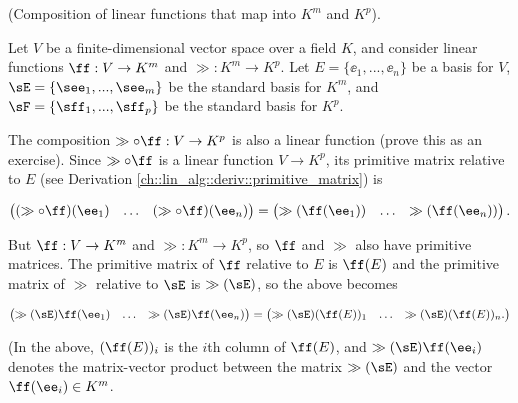 \begin{defn}
\label{ch::lin_alg::thm::matrix_matrix_product_relative_to_bases_primitive}

    (Composition of linear functions that map into $K^m$ and $K^p$). 
    
    Let $V$ be a finite-dimensional vector space over a field $K$, and consider linear functions $\ff:V \rightarrow K^m$ and $\gg:K^m \rightarrow K^p$. Let $E = \{\ee_1, ..., \ee_n\}$ be a basis for $V$, $\sE = \{\see_1, ..., \see_m\}$ be the standard basis for $K^m$, and $\sF = \{\sff_1, ..., \sff_p\}$ be the standard basis for $K^p$.
    
    The composition $\gg \circ \ff:V \rightarrow K^p$ is also a linear function (prove this as an exercise). Since $\gg \circ \ff$ is a linear function $V \rightarrow K^p$, its primitive matrix relative to $E$ (see Derivation \ref{ch::lin_alg::deriv::primitive_matrix}) is
    
    \begin{align*}
        \begin{pmatrix}
            (\gg \circ \ff)(\ee_1) & \hdots & (\gg \circ \ff)(\ee_n)
        \end{pmatrix}
        =
        \begin{pmatrix}
            \gg(\ff(\ee_1)) & \hdots & \gg(\ff(\ee_n))
        \end{pmatrix}.
    \end{align*}
    
    But $\ff:V \rightarrow K^m$ and $\gg:K^m \rightarrow K^p$, so $\ff$ and $\gg$ also have primitive matrices. The primitive matrix of $\ff$ relative to $E$ is $\ff(E)$ and the primitive matrix of $\gg$ relative to $\sE$ is $\gg(\sE)$, so the above becomes
    
    \begin{align*}
        \begin{pmatrix}
            \gg(\sE) \ff(\ee_1) & \hdots & \gg(\sE) \ff(\ee_n)
        \end{pmatrix}
        =
        \begin{pmatrix} 
            \gg(\sE) (\ff(E))_1 & \hdots & \gg(\sE) (\ff(E))_n.
        \end{pmatrix}
    \end{align*}
    
    (In the above, $(\ff(E))_i$ is the $i$th column of $\ff(E)$, and $\gg(\sE) \ff(\ee_i)$ denotes the matrix-vector product between the matrix $\gg(\sE)$ and the vector $\ff(\ee_i) \in K^m$.
    

\end{defn}

